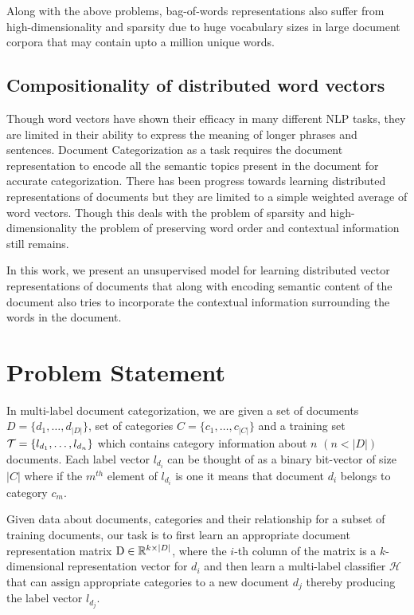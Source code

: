 Along with the above problems, bag-of-words representations 
also suffer from high-dimensionality and sparsity due to huge 
vocabulary sizes in large document corpora that may contain upto a 
million unique words.

\subsection{Compositionality of distributed word vectors}
Though word vectors have shown their efficacy in many different NLP 
tasks, they are limited in their ability to express the meaning of 
longer phrases and sentences. Document Categorization as a task 
requires the document representation to encode all the semantic topics 
present in the document for accurate categorization. There has been 
progress towards learning distributed representations of documents but 
they are limited to a simple weighted average of word vectors. Though 
this deals with the problem of sparsity and high-dimensionality the 
problem of preserving word order and contextual information still remains.

In this work, we present an unsupervised model for learning 
distributed vector representations of documents that along with 
encoding semantic content of the document also tries to incorporate 
the contextual information surrounding the words in the document.

\section{Problem Statement}	
In multi-label document categorization, we are given a set of documents $D = \{d_{1}, \ldots, d_{|D|}\}$, set of categories $C = \{c_{1}, \ldots, c_{|C|}\}$ and a training set $\mathcal{T} = \{l_{d_{1}}, \ldots, l_{d_{n}}\}$ which contains category information about $n$ $(n < |D|)$ documents. Each label vector $l_{d_{i}}$ can be thought of as a binary bit-vector of size $|C|$ where if the $m^{th}$ element of $l_{d_{i}}$ is one it means that document $d_{i}$ belongs to category $c_{m}$.  

Given data about documents, categories and their relationship for a 
subset of training documents, our task is to first learn an appropriate 
document representation matrix $\mathrm{D} \in \mathbb{R}^{k \times |D|}$, 
where the $i$-th column of the matrix is a $k$-dimensional 
representation vector for $d_{i}$ and then learn a multi-label classifier 
$\mathcal{H}$ that can assign appropriate categories to a new document $d_{j}$  thereby producing the label vector $l_{d_{j}}$.

